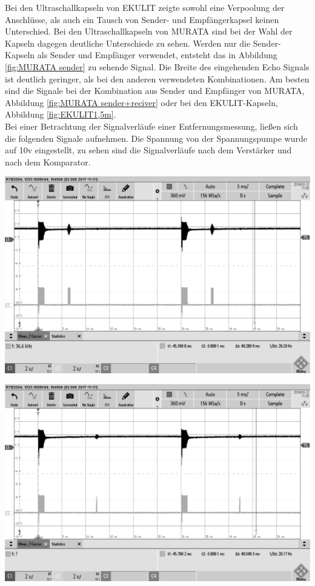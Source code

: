 Bei den Ultraschallkapseln von EKULIT zeigte sowohl eine Verpoolung der Anschlüsse, als auch ein Tausch von Sender- und Empfängerkapsel keinen Unterschied. Bei den Ultraschallkapseln von MURATA sind bei der Wahl der Kapseln dagegen deutliche Unterschiede zu sehen. Werden nur die Sender-Kapseln als Sender und Empfänger verwendet, entsteht das in Abbildung \ref{fig:MURATA sender} zu sehende Signal. Die Breite des eingehenden Echo Signals ist deutlich geringer, als bei den anderen verwendeten Kombinationen. Am besten sind die Signale bei der Kombination aus Sender und Empfänger von MURATA, Abbildung \ref{fig:MURATA sender+reciver} oder bei den EKULIT-Kapseln, Abbildung \ref{fig:EKULIT1,5m}.\\
Bei einer Betrachtung der Signalverläufe einer Entfernungsmessung, ließen sich die folgenden Signale aufnehmen. Die Spannung von der Spannungspumpe wurde auf 10v eingestellt, zu sehen sind die Signalverläufe nach dem Verstärker und nach dem Komparator.\\
\begin{minipage}{0.5\textwidth}
\includegraphics[width=1\textwidth%
]{Abbildungen/MessungenP2/10V/EKULIT1m.png}
\label{fig:EKULIT 1m}
\end{minipage}
\begin{minipage}{0.5\textwidth}
\includegraphics[width=1\textwidth%
]{Abbildungen/MessungenP2/10V/EKULIT2m.png}
\label{fig:EKULIT 2m}
\end{minipage}
